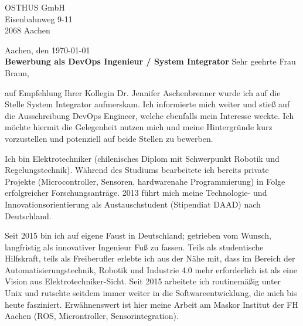 \documentclass[a4paper,10pt]{article}
\begin{document}
\pagestyle{fancyplain} %
\thispagestyle{empty} %



\pagebreak

\pagestyle{fancyplain} %

OSTHUS GmbH \\
Eisenbahnweg 9-11 \\
2068 Aachen

\hfill
Aachen, den \today
\vspace{0.05cm}
\\



\textbf{Bewerbung als DevOps Ingenieur / System Integrator} \vfill
Sehr geehrte Frau Braun,\vfill

auf Empfehlung Ihrer Kollegin Dr. Jennifer Aschenbrenner wurde ich auf die Stelle System Integrator aufmerskam. Ich informierte mich weiter und stieß auf die Ausschreibung DevOps Engineer, welche ebenfalls mein Interesse weckte. Ich möchte hiermit die Gelegenheit nutzen mich und meine Hintergründe kurz vorzustellen und potenziell auf beide Stellen zu bewerben.

Ich bin Elektrotechniker (chilenisches Diplom mit Schwerpunkt Robotik und Regelungstechnik). Während des Studiums bearbeitete ich bereits private Projekte (Microcontroller, Sensoren, hardwarenahe Programmierung) in Folge erfolgreicher Forschungsanträge. 2013 führt mich meine Technologie- und Innovationsorientierung als Austauschstudent (Stipendiat DAAD) nach Deutschland.\vfill

Seit 2015 bin ich auf eigene Faust in Deutschland; getrieben vom Wunsch, langfristig als innovativer Ingenieur Fuß zu fassen. Teils als studentische Hilfskraft, teils als Freiberufler erlebte ich aus der Nähe mit, dass im Bereich der Automatisierungstechnik, Robotik und Industrie 4.0 mehr erforderlich ist als eine Vision aus Elektrotechniker-Sicht. Seit 2015 arbeitete ich routinemäßig unter Unix und rutschte seitdem immer weiter in die Softwareentwicklung, die mich bis heute fasziniert. Erwähnenswert ist hier meine Arbeit am Maskor Institut der FH Aachen (ROS, Microntroller, Sensorintegration). \vfill
\end{document}
